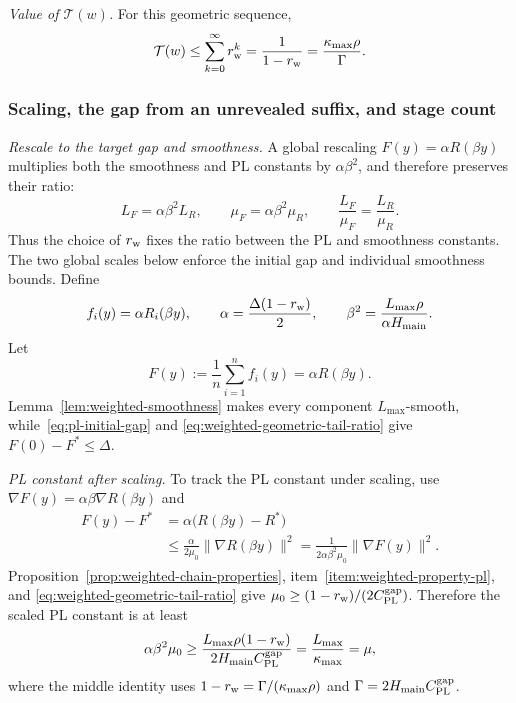 \documentclass{article}
\theoremstyle{definition}
\begin{document}
\emph{Value of $\mathcal T(w)$.}
For this geometric sequence,
\begin{equation}
 \mathcal T(w)
 \le\sum_{k=0}^{\infty}r_{\rm w}^k
 =\frac1{1-r_{\rm w}}
 =\frac{\kappa_{\max}\rho}{\Gamma}.
 \label{eq:weighted-geometric-tail-ratio}
\end{equation}

\subsubsection{Scaling, the gap from an unrevealed suffix, and stage count}

\emph{Rescale to the target gap and smoothness.}
A global rescaling $F(y)=\alpha R(\beta y)$ multiplies both the smoothness and
PL constants by $\alpha\beta^2$, and therefore preserves their ratio:
\begin{equation}
 L_F=\alpha\beta^2L_R,
 \qquad
 \mu_F=\alpha\beta^2\mu_R,
 \qquad
 \frac{L_F}{\mu_F}=\frac{L_R}{\mu_R}.
 \label{eq:global-scaling-condition-number}
\end{equation}
Thus the choice of $r_{\rm w}$ fixes the ratio between the PL and smoothness
constants.  The two global scales below enforce the initial gap and individual
smoothness bounds.  Define
\begin{equation}
 f_i(y)=\alpha R_i(\beta y),
 \qquad
 \alpha=\frac{\Delta(1-r_{\rm w})}{2},
 \qquad
 \beta^2=\frac{L_{\max}\rho}{\alpha H_{\rm main}}.
 \label{eq:pl-scaling}
\end{equation}
Let
\begin{equation}
 F(y):=\frac1n\sum_{i=1}^nf_i(y)=\alpha R(\beta y).
 \label{eq:weighted-scaled-average}
\end{equation}
Lemma~\ref{lem:weighted-smoothness} makes every component
$L_{\max}$-smooth, while~\eqref{eq:pl-initial-gap} and
\eqref{eq:weighted-geometric-tail-ratio} give $F(0)-F^*\le\Delta$.

\emph{PL constant after scaling.}
To track the PL constant under scaling, use
$\nabla F(y)=\alpha\beta\nabla R(\beta y)$ and
\begin{equation}
\begin{aligned}
 F(y)-F^*
 &=\alpha\bigl(R(\beta y)-R^*\bigr)\\
 &\le\frac{\alpha}{2\mu_0}\|\nabla R(\beta y)\|^2
 =\frac1{2\alpha\beta^2\mu_0}\|\nabla F(y)\|^2.
\end{aligned}
\label{eq:pl-scaling-identity}
\end{equation}
Proposition~\ref{prop:weighted-chain-properties},
item~\ref{item:weighted-property-pl}, and
\eqref{eq:weighted-geometric-tail-ratio} give
$\mu_0\ge(1-r_{\rm w})/(2C_{\rm PL}^{\rm gap})$.  Therefore the scaled PL
constant is at
least
\begin{equation}
 \alpha\beta^2\mu_0
 \ge\frac{L_{\max}\rho(1-r_{\rm w})}
 {2H_{\rm main}C_{\rm PL}^{\rm gap}}
 =\frac{L_{\max}}{\kappa_{\max}}
 =\mu,
 \label{eq:scaled-pl-constant}
\end{equation}
where the middle identity uses
$1-r_{\rm w}=\Gamma/(\kappa_{\max}\rho)$ and
$\Gamma=2H_{\rm main}C_{\rm PL}^{\rm gap}$.
\end{document}
